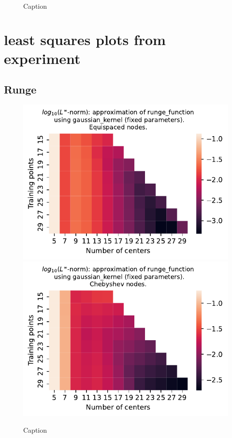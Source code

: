 \documentclass[12pt]{report} %
\begin{document}
\begin{figure}[ht]\caption{Caption}\label{fig:asymptotic-sin_pi_x_sq-TR29}\end{figure}
\clearpage


\section*{least squares plots from experiment}

\subsection*{Runge}

\begin{figure}[ht]
    \centering
    
    \includegraphics[width=.49\textwidth]{imagenes/experiments/1d/least_squares/opt-runge_function-Kgaussian_kernel-Equi.pdf}
    \includegraphics[width=.49\textwidth]{imagenes/experiments/1d/least_squares/opt-runge_function-Kgaussian_kernel-Cheb.pdf}
    \caption{Caption}
    \label{fig:opt-runge-gaussian}
\end{figure}
\end{document}
